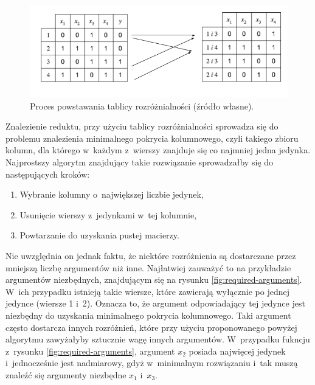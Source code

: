 \begin{figure}[h]
\centering
\includegraphics[width = 13cm]{chapter02/discernibility-table.png}
\caption{Proces powstawania tablicy rozróżnialności (źródło własne).}
\label{fig:discernibility-table}
\end{figure}

Znalezienie reduktu,
przy użyciu tablicy rozróżnialności sprowadza się do problemu znalezienia minimalnego pokrycia kolumnowego,
czyli takiego zbioru kolumn,
dla którego w~każdym z~wierszy znajduje się co najmniej jedna jedynka.
Najprostszy algorytm znajdujący takie rozwiązanie sprowadzałby się do następujących kroków:
\begin{enumerate}
\item Wybranie kolumny o~największej liczbie jedynek,
\item Usunięcie wierszy z~jedynkami w~tej kolumnie,
\item Powtarzanie do uzyskania pustej macierzy.
\end{enumerate}

Nie uwzględnia on jednak faktu,
że niektóre rozróżnienia są dostarczane przez mniejszą liczbę argumentów niż inne.
Najłatwiej zauważyć to na przykładzie argumentów niezbędnych, znajdującym się na rysunku \ref{fig:required-arguments}.
W~ich przypadku istnieją takie wiersze,
które zawierają wyłącznie po jednej jedynce (wiersze 1 i~2).
Oznacza to,
że argument odpowiadający tej jedynce jest niezbędny do uzyskania minimalnego pokrycia kolumnowego.
Taki argument często dostarcza innych rozróżnień,
które przy użyciu proponowanego powyżej algorytmu zawyżałyby sztucznie wagę innych argumentów.
W~przypadku fukncju z~rysunku \ref{fig:required-arguments},
argument $x_2$ posiada najwięcej jedynek i~jednocześnie jest nadmiarowy,
gdyż w~minimalnym rozwiązaniu i~tak muszą znaleźć się argumenty niezbędne $x_1$ i~$x_3$.

